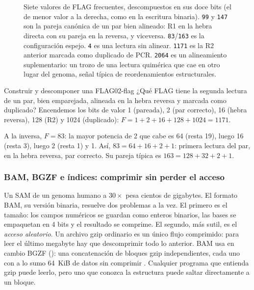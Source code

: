 \begin{figure}[t]
\centering

\caption[La FLAG bit a bit]{Siete valores de FLAG frecuentes, descompuestos en sus doce bits (el de menor valor a la derecha, como en la escritura binaria). \texttt{99} y \texttt{147} son la pareja canónica de un par bien alineado: R1 en la hebra directa con su pareja en la reversa, y viceversa. \texttt{83}/\texttt{163} es la configuración espejo. \texttt{4} es una lectura sin alinear. \texttt{1171} es la R2 anterior marcada como duplicado de PCR. \texttt{2064} es un alineamiento suplementario: un trozo de una lectura quimérica que cae en otro lugar del genoma, señal típica de reordenamientos estructurales.}
\label{fig:02-flag}
\end{figure}

\begin{ejemplo}{Construir y descomponer una FLAG}{02-flag}
¿Qué FLAG tiene la segunda lectura de un par, bien emparejada, alineada en la hebra reversa y marcada como duplicado? Encendemos los bits de valor 1 (pareada), 2 (par correcto), 16 (hebra reversa), 128 (R2) y 1024 (duplicado): $F = 1+2+16+128+1024 = 1171$.

A la inversa, $F=83$: la mayor potencia de 2 que cabe es 64 (resta 19), luego 16 (resta 3), luego 2 (resta 1) y 1. Así, $83 = 64+16+2+1$: primera lectura del par, en la hebra reversa, par correcto. Su pareja típica es $163=128+32+2+1$.
\end{ejemplo}

\subsubsection{BAM, BGZF e índices: comprimir sin perder el acceso}

Un SAM de un genoma humano a $30\times$ pesa cientos de gigabytes. El formato BAM, su versión binaria, resuelve dos problemas a la vez. El primero es el tamaño: los campos numéricos se guardan como enteros binarios, las bases se empaquetan en 4 bits y el resultado se comprime. El segundo, más sutil, es el \emph{acceso aleatorio}. Un archivo gzip ordinario es un único flujo comprimido: para leer el último megabyte hay que descomprimir todo lo anterior. BAM usa en cambio BGZF (): una concatenación de bloques gzip independientes, cada uno con a lo sumo \SI{64}{KiB} de datos sin comprimir \parencite{c02-li2009}. Cualquier programa que entienda gzip puede leerlo, pero uno que conozca la estructura puede saltar directamente a un bloque.

